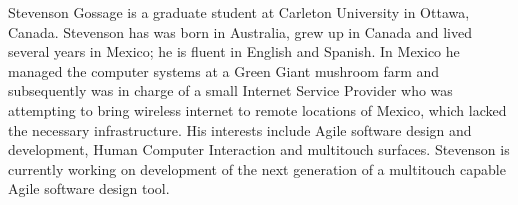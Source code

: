 \documentclass[lnbip]{svmultln}
\begin{document}
%
\mainmatter              %
%
Stevenson Gossage is a graduate student at Carleton University in Ottawa,
Canada. Stevenson has was born in Australia, grew up in Canada and lived
several years in Mexico; he is fluent in English and Spanish. In Mexico he
managed the computer systems at a Green Giant mushroom farm and subsequently was
in charge of a small Internet Service Provider who was attempting to bring wireless internet to remote locations of Mexico, which lacked the necessary
infrastructure. His interests include Agile software design and development,
Human Computer Interaction and multitouch surfaces. Stevenson is currently
working on development of the next generation of a multitouch capable Agile
software design tool.
\end{document}
